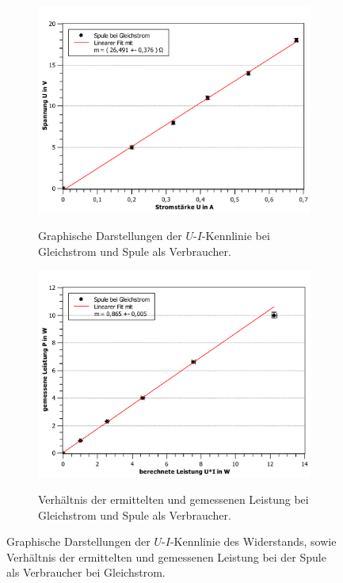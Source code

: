 \begin{figure}[ht]
	
	\centering	
	\begin{subfigure}{0.70\textwidth}
		\centering
		\includegraphics[width=\textwidth]{auswertung/spule-gleich-Widerstand.pdf}
		\label{fig:5}
		\caption{Graphische Darstellungen der $U$-$I$-Kennlinie bei Gleichstrom und Spule als Verbraucher.}	
	\end{subfigure}
	\begin{subfigure}{0.70\textwidth}
		\centering
		\includegraphics[width=\textwidth]{auswertung/spule-gleich-Leistung.pdf}
		\label{fig:6}
		\caption{Verhältnis der ermittelten und gemessenen Leistung bei Gleichstrom und Spule als Verbraucher.}	
	\end{subfigure}
	\caption{Graphische Darstellungen der $U$-$I$-Kennlinie des Widerstands, sowie Verhältnis der ermittelten und gemessenen Leistung bei der Spule als Verbraucher bei Gleichstrom.}
	\label{fig:Spule_gleich}
\end{figure}
